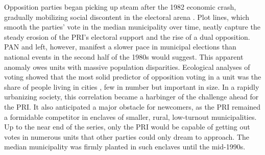 \documentclass[letter,12pt]{article}
\begin{document}
Opposition parties began picking up steam after the 1982 economic crash, gradually mobilizing social discontent in the electoral arena \citep{molinar.1991a, klesner.Alignment.1993, hiskey.canache.2005, gomezTagle.Estadisticas1990, segovia.dientes-sierra1983}. Plot lines, which smooth the parties' vote in the median municipality over time, neatly capture the steady erosion of the PRI's electoral support and the rise of a dual opposition. PAN and left, however, manifest a slower pace in municipal elections than national events in the second half of the 1980s would suggest. This apparent anomaly owes units with massive population disparities. Ecological analyses of voting showed that the most solid predictor of opposition voting in a unit was the share of people living in cities \citep{ames.1970, lehr.1985, magar.1994, walton.sween-1973, pacheco.VotoUrb.1997}, few in number but important in size. In a rapidly urbanizing society, this correlation became a harbinger of the challenge ahead for the PRI. It also anticipated a major obstacle for newcomers, as the PRI remained a formidable competitor in enclaves of smaller, rural, low-turnout municipalities. Up to the near end of the series, only the PRI would be capable of getting out votes in numerous units that other parties could only dream to approach. The median municipality was firmly planted in such enclaves until the mid-1990s.
\end{document}

